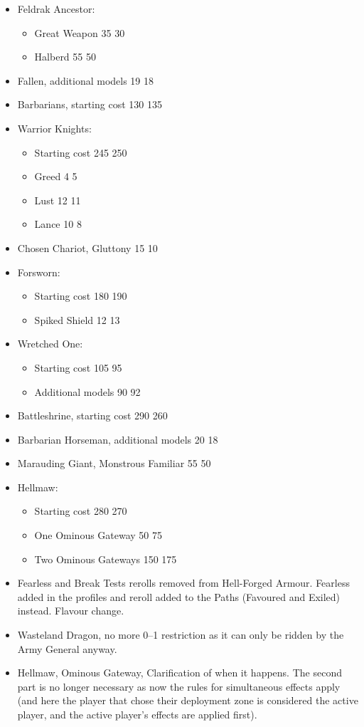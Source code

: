 \begin{itemize}
\item Feldrak Ancestor:
\begin{itemize}
\item Great Weapon 35 \costdown{} 30
\item Halberd 55 \costdown{} 50
\end{itemize}
\item Fallen, additional models 19 \costdown{} 18
\item Barbarians, starting cost 130 \costup{} 135
\item Warrior Knights:
\begin{itemize}
\item Starting cost 245 \costup{} 250
\item Greed 4 \costup{} 5
\item Lust 12 \costdown{} 11
\item Lance 10 \costdown{} 8
\end{itemize}
\item Chosen Chariot, Gluttony 15 \costdown{} 10
\item Forsworn:
\begin{itemize}
\item Starting cost 180 \costup{} 190
\item Spiked Shield 12 \costup{} 13
\end{itemize}
\item Wretched One:
\begin{itemize}
\item Starting cost 105 \costdown{} 95
\item Additional models 90 \costup{} 92
\end{itemize}
\item Battleshrine, starting cost 290 \costdown{} 260
\item Barbarian Horseman, additional models 20 \costdown{} 18
\item Marauding Giant, Monstrous Familiar 55 \costdown{} 50
\item Hellmaw:
\begin{itemize}
\item Starting cost 280 \costdown{} 270
\item One Ominous Gateway 50 \costup{} 75
\item Two Ominous Gateways 150 \costup{} 175
\end{itemize}
\end{itemize}

\subtitle{Clarification and rewording}

\begin{itemize}
\item Fearless and Break Tests rerolls removed from Hell-Forged Armour. Fearless added in the profiles and reroll added to the Paths (Favoured and Exiled) instead. Flavour change.
\item Wasteland Dragon, no more 0--1 restriction as it can only be ridden by the Army General anyway.
\item Hellmaw, Ominous Gateway, Clarification of when it happens. The second part is no longer necessary as now the rules for simultaneous effects apply (and here the player that chose their deployment zone is considered the active player, and the active player's effects are applied first).
\end{itemize}
